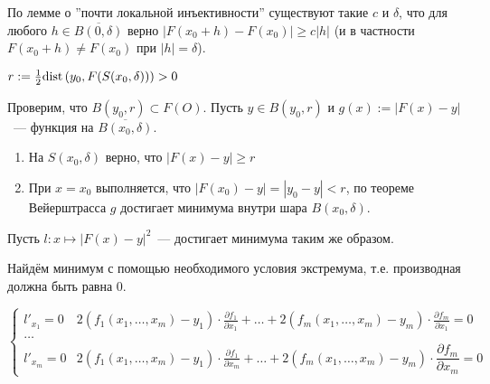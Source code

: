 \documentclass{article}
\begin{document}
            По лемме о ''почти локальной инъективности'' существуют такие $c$ и $\delta$, что для любого $h \in \overline{B(0, \delta)}$ верно $\left| F(x_0 + h) - F(x_0) \right| \geqslant c | h |$ (и в частности $F(x_0 + h) \neq F(x_0)$ при $| h | = \delta$).
            
            $r := \frac{1}{2} \mathrm{dist} \left( y_0, F(S(x_0, \delta)) \right) > 0$
            
            Проверим, что $B(y_0, r) \subset F(O)$. Пусть $y \in B(y_0, r)$ и $g(x) := \left| F(x) - y \right|$~--- функция на $\overline{B(x_0, \delta)}$.
            
            \begin{enumerate}
            
                \item На $S(x_0, \delta)$ верно, что $\left| F(x) - y \right| \geqslant r$
                
                \item При $x = x_0$ выполняется, что $\left| F(x_0) - y \right| = | y_0 - y | < r$, по теореме Вейерштрасса $g$ достигает минимума внутри шара $B(x_0, \delta)$.
                
            \end{enumerate}
            
            Пусть $l : x \mapsto \left| F(x) - y \right|^2$~--- достигает минимума таким же образом.
            
            Найдём минимум с помощью необходимого условия экстремума, т.е. производная должна быть равна $0$.
            
            \begin{equation*}
                \begin{cases}
   
                    l'_{x_1} = 0 & 2 (f_1 (x_1, \ldots, x_m) - y_1) \cdot \frac{\partial f_1}{\partial x_1} + \ldots + 2 (f_m (x_1, \ldots, x_m) - y_m) \cdot \frac{\partial f_m}{\partial x_1} = 0 \\
                    
                    \ldots \\
                    
                    l'_{x_m} = 0 & 2 (f_1 (x_1, \ldots, x_m) - y_1) \cdot \frac{\partial f_1}{\partial x_m} + \ldots + 2 (f_m (x_1, \ldots, x_m) - y_m) \cdot \dfrac{\partial f_m}{\partial x_m} = 0
                
                \end{cases}
            \end{equation*}
            
\end{document}
